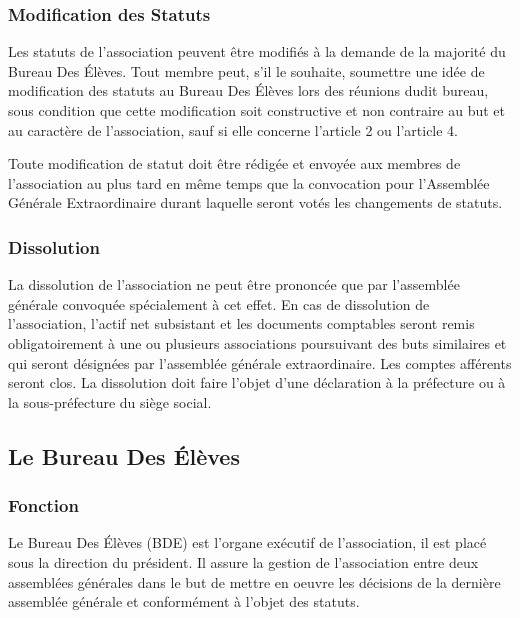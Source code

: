 \documentclass{article} %
\begin{document}
			\subsubsection{Modification des Statuts}
				Les statuts de l’association peuvent être modifiés à la demande de la
				majorité du Bureau Des Élèves. Tout membre peut, s’il le souhaite,
				soumettre une idée de modification des statuts au Bureau Des Élèves
				lors des réunions dudit bureau, sous condition que cette modification
				soit constructive et non contraire au but et au caractère de
				l’association, sauf si elle concerne l'article 2 ou l'article 4.

				Toute modification de statut doit être rédigée et envoyée aux membres
				de l’association au plus tard en même temps que la convocation pour
				l’Assemblée Générale Extraordinaire durant laquelle seront votés les
				changements de statuts.

			\subsubsection{Dissolution}
				La dissolution de l’association ne peut être prononcée que par
				l’assemblée générale convoquée spécialement à cet effet.
				En cas de dissolution de l’association, l’actif net subsistant et les
				documents comptables seront remis obligatoirement à une ou plusieurs
				associations poursuivant des buts similaires et qui seront désignées
				par l’assemblée générale extraordinaire. Les comptes afférents seront
				clos.
				La dissolution doit faire l’objet d’une déclaration à la préfecture
				ou à la sous-préfecture du siège social.

		\subsection{Le Bureau Des Élèves}
			\subsubsection{Fonction}
				Le Bureau Des Élèves (BDE) est l'organe exécutif de l'association, il
				est placé sous la direction du président. Il assure la gestion de
				l'association entre deux assemblées générales dans le but de mettre
				en oeuvre les décisions de la dernière assemblée générale et
				conformément à l'objet des statuts.
\end{document}
